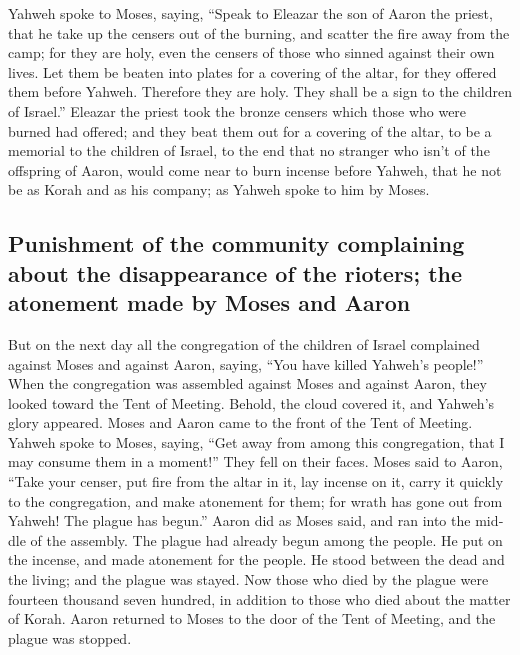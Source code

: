 \begin{paracol}{2}
\begin{otherlanguage}{english}
 Yahweh spoke to Moses, saying,  ``Speak
to Eleazar the son of Aaron the priest, that he take up the censers out
of the burning, and scatter the fire away from the camp; for they are
holy,  even the censers of those who sinned against their
own lives. Let them be beaten into plates for a covering of the altar,
for they offered them before Yahweh. Therefore they are holy. They shall
be a sign to the children of Israel.''  Eleazar the
priest took the bronze censers which those who were burned had offered;
and they beat them out for a covering of the altar,  to
be a memorial to the children of Israel, to the end that no stranger who
isn't of the offspring of Aaron, would come near to burn incense before
Yahweh, that he not be as Korah and as his company; as Yahweh spoke to
him by Moses.

\hypertarget{punishment-of-the-community-complaining-about-the-disappearance-of-the-rioters-the-atonement-made-by-moses-and-aaron}{%
\subsection{Punishment of the community complaining about the
disappearance of the rioters; the atonement made by Moses and
Aaron}\label{punishment-of-the-community-complaining-about-the-disappearance-of-the-rioters-the-atonement-made-by-moses-and-aaron}}

 But on the next day all the congregation of the children
of Israel complained against Moses and against Aaron, saying, ``You have
killed Yahweh's people!''  When the congregation was
assembled against Moses and against Aaron, they looked toward the Tent
of Meeting. Behold, the cloud covered it, and Yahweh's glory appeared.
 Moses and Aaron came to the front of the Tent of
Meeting.  Yahweh spoke to Moses, saying, 
``Get away from among this congregation, that I may consume them in a
moment!'' They fell on their faces.  Moses said to Aaron,
``Take your censer, put fire from the altar in it, lay incense on it,
carry it quickly to the congregation, and make atonement for them; for
wrath has gone out from Yahweh! The plague has begun.'' 
Aaron did as Moses said, and ran into the middle of the assembly. The
plague had already begun among the people. He put on the incense, and
made atonement for the people.  He stood between the dead
and the living; and the plague was stayed.  Now those who
died by the plague were fourteen thousand seven hundred, in addition to
those who died about the matter of Korah.  Aaron returned
to Moses to the door of the Tent of Meeting, and the plague was stopped.


\end{otherlanguage}
\end{paracol}
